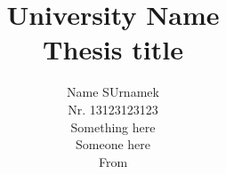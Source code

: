 
\title{
    {\large \textbf{University Name} }\\
    \vspace{2cm}
    {\Huge \textbf{Thesis title {\small \textregistered} \break}}
}
\author {
    { Name SUrnamek}\\
    \vspace{1cm}
    {Nr. 13123123123 }\\
    {\small Something here\break}\\
    {Someone here}\\
    {From}\\
    \vspace{1cm}
}

 

\maketitle
\thispagestyle{empty}